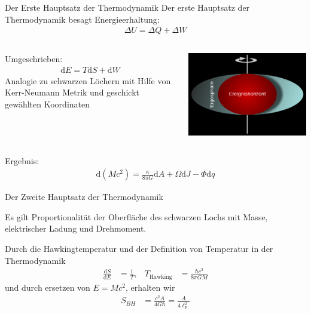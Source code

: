 \documentclass[ngerman,ph]{URbeamer}
\newcommand{\diff}{\mathrm{d}}
\begin{document}
	
	\begin{frame}{Der Erste Hauptsatz der Thermodynamik}
		Der erste Hauptsatz der Thermodynamik besagt Energieerhaltung:
		\begin{align*}
		\Delta U = \Delta Q + \Delta W
		\end{align*}
		\begin{columns}
			\begin{column}{6cm}
				Umgeschrieben:
					\begin{align*}
					\diff E = T\diff S + \diff W
					\end{align*}
				Analogie zu schwarzen Löchern mit Hilfe von Kerr-Neumann Metrik und geschickt gewählten Koordinaten
			\end{column}
			\begin{column}{4.5cm}
					\includegraphics[width=\textwidth]{Kerr-Neumann}
				\vfill
			\end{column}
		\end{columns}
	\vfill
	Ergebnis:
		\begin{align*}
		\diff (Mc^2) = \frac{\kappa}{8 \pi G} \diff A + \Omega \diff J - \Phi \diff q
		\end{align*} 	 		
	\end{frame}	

	\begin{frame}{Der Zweite Hauptsatz der Thermodynamik}
		\begin{block}{}
		Es gilt Proportionalität der Oberfläche des schwarzen Lochs mit Masse, elektrischer Ladung und Drehmoment.
		\end{block}
		Durch die Hawkingtemperatur und der Definition von Temperatur in der Thermodynamik
		\begin{align*}
		\frac{\diff S}{\diff E} &= \frac{1}{T},&
		T_{\text{Hawking}} &= \frac{\hbar c^3}{8 \pi G M}
		\end{align*}
		und durch ersetzen von $E = Mc^2$, erhalten wir
		\begin{align*}
		S_{BH} &= \frac{c^3 A}{4 G \hbar} = \frac{A}{4 \ell_{\mathrm{P}}^2} 
		\end{align*}
	\end{frame}
	
\end{document}
